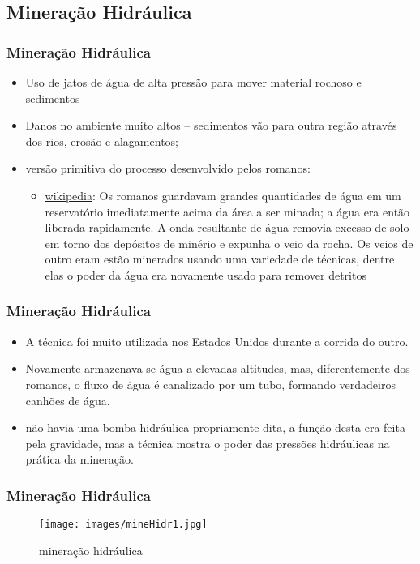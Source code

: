 \documentclass{beamer}
\begin{document}
\subsection{Mineração Hidráulica}
\begin{frame}
	\frametitle{Mineração Hidráulica}
\begin{itemize}
    \item Uso de jatos de água de alta pressão para mover material rochoso e sedimentos 
    \item Danos no ambiente muito altos – sedimentos vão para outra região através dos rios, erosão e alagamentos;
    \item versão primitiva do processo desenvolvido pelos romanos:
    \begin{itemize}
    \item \href{http://en.wikipedia.org/wiki/Hydraulic_mining}{wikipedia}: Os romanos guardavam grandes quantidades de água em um reservatório imediatamente acima da área a ser minada; a água era então liberada rapidamente. A onda resultante de água removia excesso de solo em torno dos depósitos de minério e expunha o veio da rocha. Os veios de outro eram estão minerados usando uma variedade de técnicas, dentre elas o poder da água era novamente usado para remover detritos
    \end{itemize}
\end{itemize}
\end{frame}


\begin{frame}
	\frametitle{Mineração Hidráulica}
\begin{itemize}
    \item A técnica foi muito utilizada nos Estados Unidos durante a corrida do outro.
    \item Novamente armazenava-se água a elevadas altitudes, mas, diferentemente dos romanos, o fluxo de água é canalizado por um tubo, formando verdadeiros canhões de água.
    \item não havia uma bomba hidráulica propriamente dita, a função desta era feita pela gravidade, mas a técnica mostra o poder das pressões hidráulicas na prática da mineração.
    \end{itemize}
\end{frame}

\begin{frame}
	\frametitle{Mineração Hidráulica}
    \begin{figure}
    	\centering
    	\texttt{[image: images/mineHidr1.jpg]}
		\caption{mineração hidráulica}
		\label{fig:mineHidr1}
    \end{figure}
\end{frame}
\end{document}
